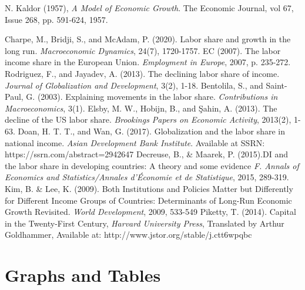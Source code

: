 \documentclass[12pt, letterpaper]{article}
\numberwithin{table}{section}   %
\begin{document}
\begin{thebibliography}{100}
	 N. Kaldor (1957), \textit{A Model of Economic Growth}. The Economic Journal, vol 67, Issue 268, pp. 591-624, 1957.
	 
 
     Charpe, M., Bridji, S., and McAdam, P. (2020). Labor share and growth in the long run. \textit{Macroeconomic Dynamics}, 24(7), 1720-1757.
     EC (2007). The labor income share in the European Union. \textit{Employment in Europe}, 2007, p. 235-272.
     Rodriguez, F., and Jayadev, A. (2013). The declining labor share of income.\textit{ Journal of Globalization and Development}, 3(2), 1-18.
     Bentolila, S., and Saint-Paul, G. (2003). Explaining movements in the labor share.\textit{ Contributions in Macroeconomics}, 3(1).
     Elsby, M. W., Hobijn, B., and Şahin, A. (2013). The decline of the US labor share. \textit{Brookings Papers on Economic Activity}, 2013(2), 1-63.
     Doan, H. T. T., and Wan, G. (2017).  Globalization and the labor share in national income. \textit{Asian Development Bank Institute}. Available at SSRN: https://ssrn.com/abstract=2942647 
     Decreuse, B., & Maarek, P. (2015).DI and the labor share in developing countries: A theory and some evidence \textit{F. Annals of Economics and Statistics/Annales d'Économie et de Statistique}, 2015, 289-319.
     Kim, B. & Lee, K. (2009). Both Institutions and Policies Matter but Differently for Different Income Groups of Countries: Determinants of Long-Run Economic Growth Revisited. \textit{World Development}, 2009, 533-549
     Piketty, T. (2014). Capital in the Twenty-First Century, \textit{Harvard University Press}, Translated by Arthur Goldhammer, Available at: http://www.jstor.org/stable/j.ctt6wpqbc
\end{thebibliography}
\clearpage
\section{Graphs and Tables}\label{Graphs}
\end{document}
